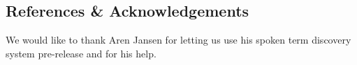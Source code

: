 \documentclass[final]{beamer}
\begin{document}
\begin{frame}[t]
\begin{multicols}{2}

\subsection{References \& Acknowledgements}

\nocite{*} %


\vspace{1cm}
We would like to thank Aren Jansen for letting us use his spoken term discovery system pre-release and for his help.


\end{multicols}

\end{frame}
\end{document}
